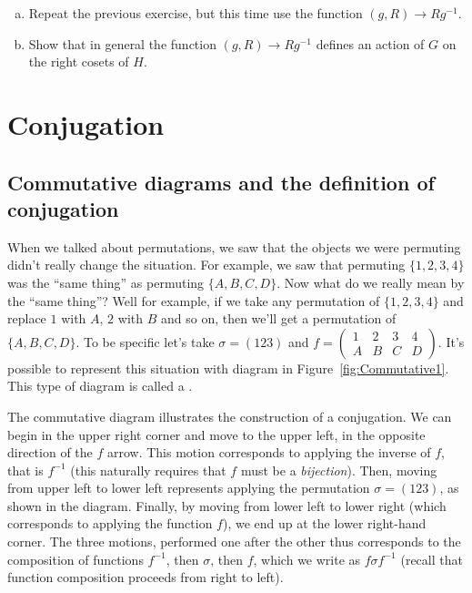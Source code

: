 \begin{exercise}\label{exercise:actions:RtCosetAction2}
\begin{enumerate}[(a)]
\item Repeat the previous exercise, but this time use the function $(g,R)\rightarrow Rg^{-1}$.
\item Show that in general the function $(g,R)\rightarrow Rg^{-1}$ defines an action of $G$ on the right cosets of $H$.  
\end{enumerate}
\end{exercise}




\section{Conjugation}
\label{sec:Conjugation}

\subsection{Commutative diagrams and the definition of conjugation}
When we talked about permutations, we saw that the objects we were permuting didn't really change the situation.  For example, we saw that permuting $\{1,2,3,4\}$ was the ``same thing'' as permuting $\{A,B,C,D\}$. Now what do we really mean by the ``same thing''? Well for example, if we take any permutation of $\{1,2,3,4\}$ and replace $1$ with $A$, $2$ with $B$ and so on, then we'll get a permutation of $\{A,B,C,D\}$. To be specific let's take $\sigma=(123)$ and $f=\begin{pmatrix} 1&2&3&4\\A&B&C&D\end{pmatrix}$.  It's possible to represent this situation with diagram in Figure~\ref{fig:Commutative1}. This type of diagram is called a .


The commutative diagram illustrates the construction of a conjugation. We can begin in the upper right corner and move to the upper left, in the opposite direction of the $f$ arrow. This motion corresponds to
applying the inverse of $f$, that is 
 $f^{-1}$ (this naturally requires that $f$ must be a \emph{bijection}).  Then, moving from upper left to lower left represents applying the permutation $\sigma=(123)$, as shown in the diagram.  Finally, by moving from lower left to lower right (which corresponds to 
applying the function $f$), we end up at the lower right-hand corner. The three motions, performed one after the other thus corresponds to the composition of functions $f^{-1}$, then $\sigma$, then $f$, which we write as
$f \sigma f^{-1}$ (recall that function composition proceeds from right to left). 

